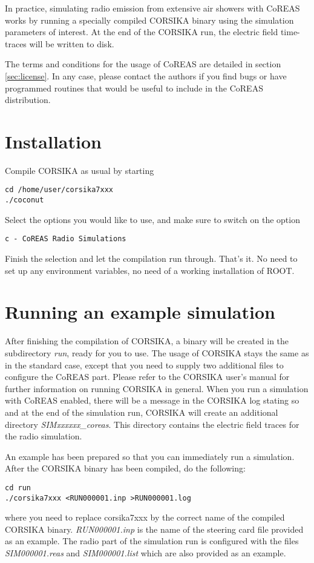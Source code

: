 \documentclass[a4paper,10pt]{article}
\begin{document}
In practice, simulating radio emission from extensive air showers with CoREAS works by running a specially compiled CORSIKA binary using the simulation parameters of interest. At the end of the CORSIKA run, the electric field time-traces will be written to disk.

The terms and conditions for the usage of CoREAS are detailed in section \ref{sec:license}. In any case, please contact the authors if you find bugs or have programmed routines that would be useful to include in the CoREAS distribution.

\section{Installation}

Compile CORSIKA as usual by starting
%
\begin{verbatim}
cd /home/user/corsika7xxx
./coconut
\end{verbatim}
%
Select the options you would like to use, and make sure to switch on the option
%
\begin{verbatim}
c - CoREAS Radio Simulations
\end{verbatim}
%
Finish the selection and let the compilation run through. That's it. No need to set up any environment variables, no need of a working installation of ROOT.

\section{Running an example simulation}

After finishing the compilation of CORSIKA, a binary will be created in the subdirectory {\it run}, ready for you to use. The usage of CORSIKA stays the same as in the standard case, except that you need to supply two additional files to configure the CoREAS part. Please refer to the CORSIKA user's manual for further information on running CORSIKA in general. When you run a simulation with CoREAS enabled, there will be a message in the CORSIKA log stating so and at the end of the simulation run, CORSIKA will create an additional directory {\it SIMxxxxxx\_coreas}. This directory contains the electric field traces for the radio simulation.

An example has been prepared so that you can immediately run a simulation. After the CORSIKA binary has been compiled, do the following:
%
\begin{verbatim}
cd run
./corsika7xxx <RUN000001.inp >RUN000001.log
\end{verbatim}
%
where you need to replace corsika7xxx by the correct name of the compiled CORSIKA binary. {\it RUN000001.inp} is the name of the steering card file provided as an example. The radio part of the simulation run is configured with the files {\it SIM000001.reas} and {\it SIM000001.list} which are also provided as an example.
\end{document}
